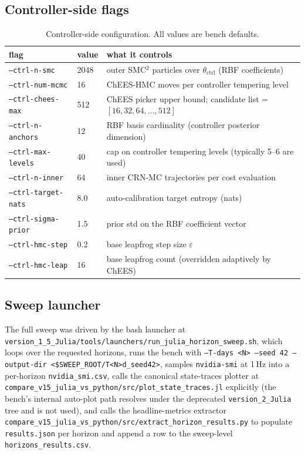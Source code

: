 \documentclass[11pt,a4paper]{article}
\begin{document}
\subsection{Controller-side flags}

\begin{table}[ht]
\centering
\small
\begin{tabular}{lll}
\toprule
flag & value & what it controls \\
\midrule
\texttt{--ctrl-n-smc}         & 2048    & outer SMC$^2$ particles over $\theta_{\mathrm{ctrl}}$ (RBF coefficients) \\
\texttt{--ctrl-num-mcmc}      & 16      & ChEES-HMC moves per controller tempering level \\
\texttt{--ctrl-chees-max}     & 512     & ChEES picker upper bound; candidate list = $[16, 32, 64, \ldots, 512]$ \\
\texttt{--ctrl-n-anchors}     & 12      & RBF basis cardinality (controller posterior dimension) \\
\texttt{--ctrl-max-levels}    & 40      & cap on controller tempering levels (typically 5--6 are used) \\
\texttt{--ctrl-n-inner}       & 64      & inner CRN-MC trajectories per cost evaluation \\
\texttt{--ctrl-target-nats}   & 8.0     & auto-calibration target entropy (nats) \\
\texttt{--ctrl-sigma-prior}   & 1.5     & prior std on the RBF coefficient vector \\
\texttt{--ctrl-hmc-step}      & 0.2     & base leapfrog step size $\varepsilon$ \\
\texttt{--ctrl-hmc-leap}      & 16      & base leapfrog count (overridden adaptively by ChEES) \\
\bottomrule
\end{tabular}
\caption{Controller-side configuration. All values are bench
defaults.}
\label{tab:ctrl_cfg}
\end{table}

\subsection{Sweep launcher}
\label{sec:launcher}

The full sweep was driven by the bash launcher at
\texttt{version\_1\_5\_Julia/tools/launchers/run\_julia\_horizon\_sweep.sh},
which loops over the requested horizons, runs the bench with
\texttt{--T-days <N> --seed 42 --output-dir <\$SWEEP\_ROOT/T<N>d\_seed42>},
samples \texttt{nvidia-smi} at 1\,Hz into a per-horizon
\texttt{nvidia\_smi.csv}, calls the canonical state-traces plotter at
\texttt{compare\_v15\_julia\_vs\_python/src/plot\_state\_traces.jl}
explicitly (the bench's internal auto-plot path resolves under the
deprecated \texttt{version\_2\_Julia} tree and is not used), and
calls the headline-metrics extractor
\texttt{compare\_v15\_julia\_vs\_python/src/extract\_horizon\_results.py}
to populate \texttt{results.json} per horizon and append a row to the
sweep-level \texttt{horizons\_results.csv}.
\end{document}
